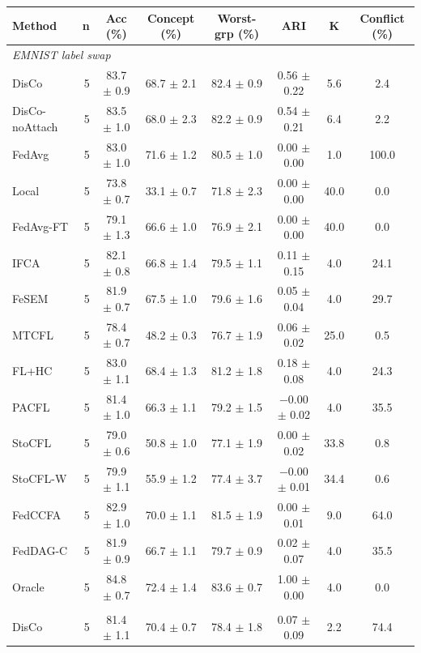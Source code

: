 {\scriptsize
\begin{tabular}{l r c c c c c c}
\toprule
Method & n & Acc (\%) & Concept (\%) & Worst-grp (\%) & ARI & K & Conflict (\%) \\
\midrule
\multicolumn{8}{l}{\textit{EMNIST label swap}} \\
DisCo & 5 & 83.7 $\pm$ 0.9 & 68.7 $\pm$ 2.1 & 82.4 $\pm$ 0.9 & 0.56 $\pm$ 0.22 & 5.6 & 2.4 \\
DisCo-noAttach & 5 & 83.5 $\pm$ 1.0 & 68.0 $\pm$ 2.3 & 82.2 $\pm$ 0.9 & 0.54 $\pm$ 0.21 & 6.4 & 2.2 \\
FedAvg & 5 & 83.0 $\pm$ 1.0 & 71.6 $\pm$ 1.2 & 80.5 $\pm$ 1.0 & 0.00 $\pm$ 0.00 & 1.0 & 100.0 \\
Local & 5 & 73.8 $\pm$ 0.7 & 33.1 $\pm$ 0.7 & 71.8 $\pm$ 2.3 & 0.00 $\pm$ 0.00 & 40.0 & 0.0 \\
FedAvg-FT & 5 & 79.1 $\pm$ 1.3 & 66.6 $\pm$ 1.0 & 76.9 $\pm$ 2.1 & 0.00 $\pm$ 0.00 & 40.0 & 0.0 \\
IFCA & 5 & 82.1 $\pm$ 0.8 & 66.8 $\pm$ 1.4 & 79.5 $\pm$ 1.1 & 0.11 $\pm$ 0.15 & 4.0 & 24.1 \\
FeSEM & 5 & 81.9 $\pm$ 0.7 & 67.5 $\pm$ 1.0 & 79.6 $\pm$ 1.6 & 0.05 $\pm$ 0.04 & 4.0 & 29.7 \\
MTCFL & 5 & 78.4 $\pm$ 0.7 & 48.2 $\pm$ 0.3 & 76.7 $\pm$ 1.9 & 0.06 $\pm$ 0.02 & 25.0 & 0.5 \\
FL+HC & 5 & 83.0 $\pm$ 1.1 & 68.4 $\pm$ 1.3 & 81.2 $\pm$ 1.8 & 0.18 $\pm$ 0.08 & 4.0 & 24.3 \\
PACFL & 5 & 81.4 $\pm$ 1.0 & 66.3 $\pm$ 1.1 & 79.2 $\pm$ 1.5 & $-$0.00 $\pm$ 0.02 & 4.0 & 35.5 \\
StoCFL & 5 & 79.0 $\pm$ 0.6 & 50.8 $\pm$ 1.0 & 77.1 $\pm$ 1.9 & 0.00 $\pm$ 0.02 & 33.8 & 0.8 \\
StoCFL-W & 5 & 79.9 $\pm$ 1.1 & 55.9 $\pm$ 1.2 & 77.4 $\pm$ 3.7 & $-$0.00 $\pm$ 0.01 & 34.4 & 0.6 \\
FedCCFA & 5 & 82.9 $\pm$ 1.0 & 70.0 $\pm$ 1.1 & 81.5 $\pm$ 1.9 & 0.00 $\pm$ 0.01 & 9.0 & 64.0 \\
FedDAG-C & 5 & 81.9 $\pm$ 0.9 & 66.7 $\pm$ 1.1 & 79.7 $\pm$ 0.9 & 0.02 $\pm$ 0.07 & 4.0 & 35.5 \\
Oracle & 5 & 84.8 $\pm$ 0.7 & 72.4 $\pm$ 1.4 & 83.6 $\pm$ 0.7 & 1.00 $\pm$ 0.00 & 4.0 & 0.0 \\
\addlinespace
\multicolumn{8}{l}{\textit{CIFAR-10 (ResNet) rotation}} \\
DisCo & 5 & 81.4 $\pm$ 1.1 & 70.4 $\pm$ 0.7 & 78.4 $\pm$ 1.8 & 0.07 $\pm$ 0.09 & 2.2 & 74.4 \\

\end{tabular}}
